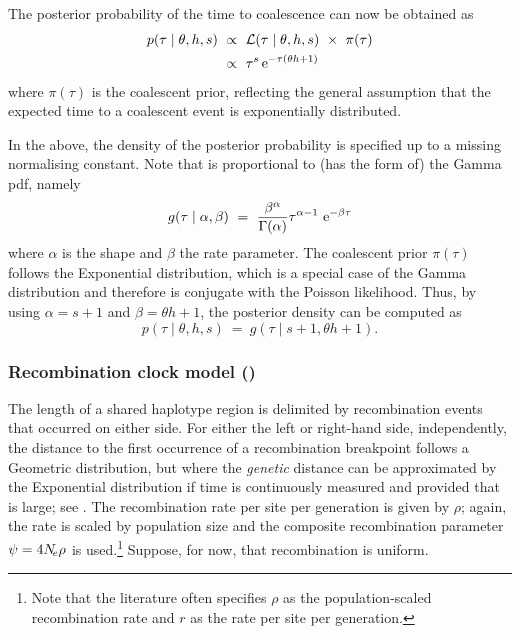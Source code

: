 The posterior probability of the time to coalescence can now be obtained as
\begin{equation}\label{eq:mut_post}
\begin{split}
	p(\tau \mid \theta,h,s)
	&~\propto~ \mathcal{L}(\tau \mid \theta,h,s)~\times~\pi(\tau) \\
	&~\propto~ \tau^s \,\mathrm{e}^{- \tau (\theta h +1)}
\end{split}
\end{equation}
where $\pi(\tau)$ is the coalescent prior, reflecting the general assumption that the expected time to a coalescent event is exponentially distributed.

In the above, the density of the posterior probability is specified up to a missing normalising constant.
Note that  is proportional to (has the form of) the Gamma \gls{pdf}, namely
\begin{equation*}
	g(\tau\mid\alpha,\beta)~=~\frac{\beta^\alpha}{\Gamma(\alpha)}\tau^{\alpha - 1}\,\,\mathrm{e}^{-\beta\tau}
\end{equation*}
where $\alpha$ is the shape and $\beta$ the rate parameter.
The coalescent prior $\pi(\tau)$ follows the Exponential distribution, which is a special case of the Gamma distribution and therefore is conjugate with the Poisson likelihood.
Thus, by using ${\alpha = s+1}$ and ${\beta = \theta h+1}$, the posterior density can be computed as
\begin{equation}
	p(\tau \mid \theta,h,s)~=~g(\tau\mid s+1, \theta h+1)\text{.}
\end{equation}




%
\subsubsection{Recombination clock model (\ClockR)}\label{sec:rec_clock}
%


The length of a shared haplotype region is delimited by  recombination events that occurred on either side.
For either the left or right-hand side, independently, the distance to the first occurrence of a recombination breakpoint follows a Geometric distribution, but where the \emph{genetic} distance can be approximated by the Exponential distribution if time is continuously measured and provided that \Ne is large; \eg see \citet{hein2004gene}.
The recombination rate per site per generation is given by $\rho$; again, the rate is scaled by population size and the composite recombination parameter ${\psi = 4 N_{\!e} \rho}$ is used.\footnote{Note that the literature often specifies $\rho$ as the population-scaled recombination rate and $r$ as the rate per site per generation.}
Suppose, for now, that recombination is uniform.

